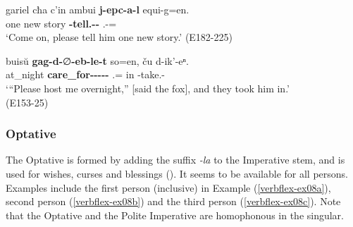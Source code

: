 \begin{exe}
	\ex\label{verbflex-ex07}
	\begin{xlist}
		
		\ex\label{verbflex-ex07a}
		\gll gariel cħa c'in ambui \textbf{j-epc-a-l} equi-g=en. \\
		{\Hort} one new story \textbf{{\J}-tell.{\Ipfv}-{\Imp}-{\Pol}} {\Prox}.{\Obl}-{\All}={\Quot} \\
		\trans `Come on, please tell him one new story.'
		\hfill (E182-225)
		
		\ex\label{verbflex-ex07b}
		\gll  buis\u{u} \textbf{gag-d-}∅\textbf{-eb-le-t} so=en, ču d-ik'-eⁿ. \\
		at\_night \textbf{care\_for-{\D}-{\Tr}-{\Imp}-{\Pol}-{\Pl}} {\Fsg}.{\Nom}={\Quot} in {\D}-take.{\Anim}-{\Aor} \\
		\trans `“Please host me overnight,” [said the fox], and they took him in.' \\
		\hfill (E153-25)
		
	\end{xlist}
\end{exe}

\subsubsection{Optative}

The Optative is formed by adding the suffix \textit{-la} to the Imperative stem, and is used for wishes, curses and blessings (\cite[181--182]{holiskygagua}). It seems to be available for all persons. Examples include the first person (inclusive) in Example (\ref{verbflex-ex08a}), second person (\ref{verbflex-ex08b}) and the third person (\ref{verbflex-ex08c}). Note that the Optative and the Polite Imperative are homophonous in the singular.




